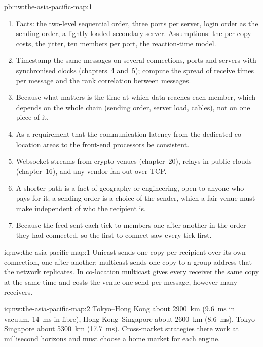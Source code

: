 \begin{solution}{pb:nw:the-asia-pacific-map:1}
\begin{enumerate}[resume]
  under sequential unicast, and about \qty{0.7}{\micro\second} before under multicast; under unicast with a fixed order it wins every race
  against the median member.
\item Facts: the two-level sequential order, three ports per server, login order as the sending order, a lightly loaded secondary server.
  Assumptions: the per-copy costs, the jitter, ten members per port, the reaction-time model.
\item Timestamp the same messages on several connections, ports and servers with synchronised clocks (chapters~4 and~5); compute the spread of
  receive times per message and the rank correlation between messages.
\item Because what matters is the time at which data reaches each member, which depends on the whole chain (sending order, server load,
  cables), not on one piece of it.
\item As a requirement that the communication latency from the dedicated co-location areas to the front-end processors be consistent.
\item Websocket streams from crypto venues (chapter~20), relays in public clouds (chapter~16), and any vendor fan-out over TCP.
\item A shorter path is a fact of geography or engineering, open to anyone who pays for it; a sending order is a choice of the sender,
  which a fair venue must make independent of who the recipient is.
\item Because the feed sent each tick to members one after another in the order they had connected, so the first to connect saw every tick
  first.
\end{enumerate}
\end{solution}

\begin{solution}{iq:nw:the-asia-pacific-map:1}
Unicast sends one copy per recipient over its own connection, one after another; multicast sends one copy to a group address that the network
replicates. In co-location multicast gives every receiver the same copy at the same time and costs the venue one send per message, however
many receivers.
\end{solution}

\begin{solution}{iq:nw:the-asia-pacific-map:2}
Tokyo--Hong Kong about \qty{2900}{\kilo\metre} (\qty{9.6}{\milli\second} in vacuum, \qty{14}{\milli\second} in fibre), Hong Kong--Singapore about
\qty{2600}{\kilo\metre} (\qty{8.6}{\milli\second}), Tokyo--Singapore about \qty{5300}{\kilo\metre} (\qty{17.7}{\milli\second}). Cross-market
strategies there work at millisecond horizons and must choose a home market for each engine.
\end{solution}

